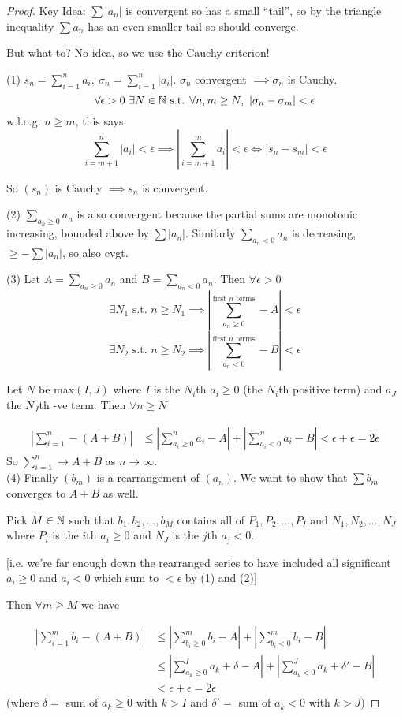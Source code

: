 \begin{proof} 
Key Idea: $\sum |a_n|$ is convergent so has a small ``tail'', so by the triangle inequality $\sum a_n$ has an even smaller tail so should converge. 

But what to? No idea, so we use the Cauchy criterion! 

(1) $s_n = \sum_{i=1}^n a_i,~\sigma_n = \sum_{i=1}^n |a_i|$. $\sigma_n$ convergent $\implies \sigma_n$ is Cauchy. 
\[\forall \epsilon > 0~\exists N \in\mathbb{N} \text{ s.t. } \forall n,m \geq N,~|\sigma_n - \sigma_m | < \epsilon\]
w.l.o.g. $n \geq m$, this says 
\[\sum_{i=m+1}^n |a_i| < \epsilon \implies \left|\sum_{i=m+1}^m a_i \right| < \epsilon \iff |s_n - s_m| < \epsilon\]

So $(s_n)$ is Cauchy $\implies s_n$ is convergent. 

(2) $\sum_{a_n \geq 0} a_n$ is also convergent because the partial sums are monotonic increasing, bounded above by $\sum |a_n|$. Similarly $\sum_{a_n < 0} a_n$ is decreasing, $\geq -\sum |a_n|$, so also cvgt. 

(3) Let $A = \sum_{a_n \geq 0} a_n$ and $B = \sum_{a_n < 0} a_n$. Then $\forall \epsilon >0$
\[\exists N_1 \text{ s.t. } n \geq N_1 \implies \left| \sum_{a_n \geq 0}^{\text{first } n \text{ terms}} - A\right| < \epsilon \]
\[\exists N_2 \text{ s.t. } n \geq N_2 \implies \left| \sum_{a_n < 0}^{\text{first } n \text{ terms}} - B\right| < \epsilon \]

Let $N$ be max$(I,J)$ where $I$ is the $N_i$th $a_i \geq 0$ (the $N_i$th positive term) and $a_J$ the $N_J$th -ve term. Then $\forall n \geq N$

\[\begin{aligned}\left|\sum_{i=1}^n - (A+B)\right| 
&\leq \left|\sum_{a_i \geq 0}^n a_i - A\right| + \left|\sum_{a_i < 0}^n a_i - B\right| < \epsilon + \epsilon = 2\epsilon 
\end{aligned}
\]
So $\sum_{i=1}^n \to A+B$ as $n \to \infty$.\\

(4) Finally $(b_m)$ is a rearrangement of $(a_n)$. We want to show that $\sum b_m$ converges to $A+B$ as well. 

Pick $M \in\mathbb{N}$ such that $b_1,b_2,\dots,b_M$ contains all of $P_1,P_2,\dots,P_I$ and $N_1,N_2,\dots,N_J$ where $P_i$ is the $i$th $a_i \geq 0$ and $N_J$ is the $j$th $a_j <0$. 

[i.e. we're far enough down the rearranged series to have included all significant $a_i \geq 0$ and $a_i <0$ which sum to $<\epsilon$ by (1) and (2)]

Then $\forall m \geq M$ we have

\[\begin{aligned}
\left|\sum_{i=1}^m b_i - (A+B)\right| 
&\leq \left|\sum_{b_i \geq 0}^m b_i - A\right| + \left|\sum_{b_i < 0}^m b_i - B\right|\\
&\leq \left|\sum_{a_k \geq 0}^I a_k + \delta - A\right| + \left|\sum_{a_k < 0}^J a_k +\delta' - B\right|\\
&< \epsilon + \epsilon = 2\epsilon 
\end{aligned}
\]
(where $\delta =$ sum of $a_k \geq 0$ with $k >I$ and $\delta' =$ sum of $a_k < 0$ with $k > J$) \end{proof}

